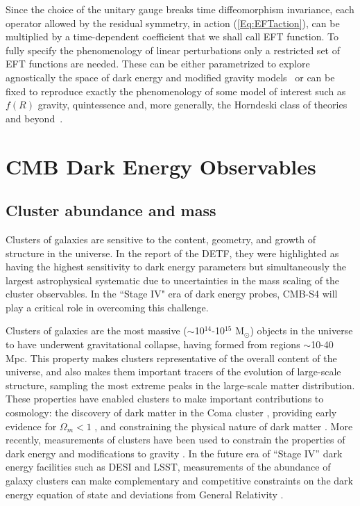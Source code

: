 Since the choice of the unitary gauge breaks time diffeomorphism invariance, each operator allowed by the residual symmetry, in action (\ref{Eq:EFTaction}), can be multiplied by a time-dependent coefficient that we shall call EFT function. To fully specify the phenomenology of linear perturbations only a restricted set of EFT functions are needed. These can be either parametrized to explore agnostically the space of dark energy and modified gravity models~\cite{Gleyzes:2013ooa,Bloomfield:2013efa,Piazza:2013coa,Gleyzes:2014rba} or can be fixed to reproduce exactly the phenomenology of some model of interest such as $f(R)$ gravity, quintessence and, more generally, the Horndeski class of theories and beyond~\cite{Gleyzes:2014dya,Frusciante:2015maa,Frusciante:2016xoj}.
%


\section{CMB  Dark Energy Observables}

\subsection{Cluster abundance and mass}

Clusters of galaxies are sensitive to the content, geometry, and growth of structure in the universe.     In the report of the DETF, they were highlighted as having the highest sensitivity
to dark energy parameters  but simultaneously the largest astrophysical systematic due
to uncertainties in the mass scaling of the cluster observables.   In the ``Stage IV" era of
dark energy probes, CMB-S4 will play a critical role in overcoming this challenge.




Clusters of galaxies are the most massive ($\sim$10$^{14}$-10$^{15}$ M$_{\odot}$) objects in the universe to have underwent gravitational collapse, 
having formed from regions $\sim$10-40 Mpc.  This property makes clusters representative of the overall content of the universe, and also makes them 
important tracers of the evolution of large-scale structure, sampling the most extreme peaks in the large-scale matter distribution.  
These properties have enabled clusters to make important contributions to cosmology: the discovery of dark matter in the 
Coma cluster \cite{Zwicky:1933gu}, 
providing early evidence for $\Omega_m < 1$ \cite{White:1993wm, Donahue:1997sp, Bahcall:1998ur}, and
constraining the physical nature of dark matter \cite{Clowe:2006eq}.  
More recently, measurements of clusters have been used to constrain the properties of dark energy and modifications 
to gravity \cite{Vikhlinin:2008ym, Mantz:2009fw, Rapetti:2012bu, Benson:2011uta, Mantz:2014xba, Mantz:2014paa}.   In the future era of ``Stage IV'' dark energy 
facilities such as DESI and LSST, measurements of the abundance of galaxy clusters can make complementary and 
competitive constraints on the dark energy equation of state and deviations from General Relativity \cite{Weinberg:2012es}.  


